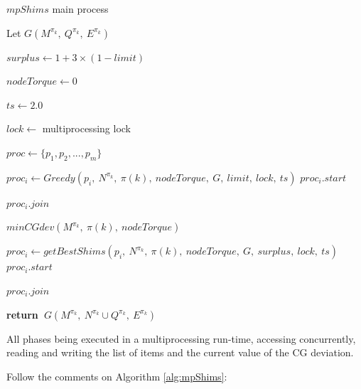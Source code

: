 \documentclass[preprint,authoryear]{elsarticle}
\renewcommand{\Return}{\State \bf {return}~}
\begin{document}
\begin{algorithm}[H]
	\caption{$mpShims$ main process}  \label{alg:mpShims}
	
	\begin{algorithmic}[1]
		
		
		\State Let $G(M^{\pi_k},\ Q^{\pi_k},\ E^{\pi_k})$ \label{mpShims:g1} 
		
		\State $surplus \gets 1 + 3 \times (1 - limit)$
		
		\State $nodeTorque \gets 0$
		
		\State $ts \gets 2.0$  \label{mpShims:ts}
		
		\State $lock \gets$ multiprocessing lock  \label{mpShims:lock} 
		
		\State $proc \gets \{p_1,p_2,..., p_m\}$  
		
		\State $proc_i \gets Greedy(p_i,\ N^{\pi_k},\ \pi(k),\ nodeTorque,\ G,\ limit,\ lock,\ ts )$   \label{mpShims:greedy}
		\State $proc_i.start$
		\EndFor
		
		\State $proc_i.join$ \label{mpShims:join1}
		\EndFor
		
		\State $minCGdev(M^{\pi_k},\ \pi(k),\ nodeTorque)$  \label{mpShims:minCGdev} 
		
		\State $proc_i \gets getBestShims(p_i,\ N^{\pi_k},\ \pi(k),\ nodeTorque,\ G,\ surplus,\ lock,\ ts )$ \label{mpShims:getBestShims}
		\State $proc_i.start$
		\EndFor
		
		\State $proc_i.join$ \label{mpShims:join2}

		\EndFor
		
		\Return $G(M^{\pi_k},\ N^{\pi_k} \cup Q^{\pi_k},\ E^{\pi_k})$ \label{mpShims:return}
		
		\EndProcedure
		
	\end{algorithmic}
\end{algorithm}


All phases being executed in a multiprocessing run-time, accessing concurrently, reading and writing the list of items and the current value of the CG deviation.

Follow the comments on Algorithm \ref{alg:mpShims}:
\end{document}
